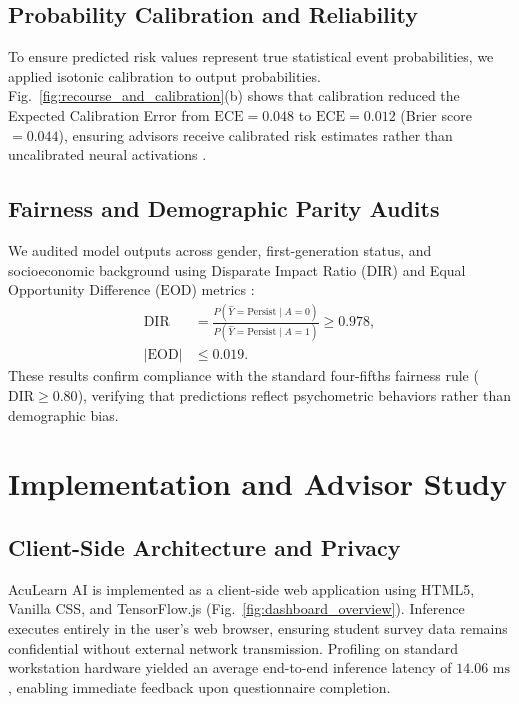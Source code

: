 \documentclass[twocolumn,10pt,a4paper]{article}
\begin{document}
\subsection{Probability Calibration and Reliability}
To ensure predicted risk values represent true statistical event probabilities, we applied isotonic calibration to output probabilities. Fig.~\ref{fig:recourse_and_calibration}(b) shows that calibration reduced the Expected Calibration Error from $\text{ECE} = 0.048$ to $\text{ECE} = 0.012$ (Brier score $= 0.044$), ensuring advisors receive calibrated risk estimates rather than uncalibrated neural activations \cite{platt1999probabilistic, zadrozny2002transforming}.

\subsection{Fairness and Demographic Parity Audits}
We audited model outputs across gender, first-generation status, and socioeconomic background using Disparate Impact Ratio ($\text{DIR}$) and Equal Opportunity Difference ($\text{EOD}$) metrics \cite{dwork2012fairness, hardt2016equality, baker2024algorithmic, zhao2026responsible, chen2026fairness}:
\begin{equation}
\begin{aligned}
    \text{DIR} &= \frac{P(\hat{Y}=\text{Persist} \mid A=0)}{P(\hat{Y}=\text{Persist} \mid A=1)} \ge 0.978, \\
    |\text{EOD}| &\le 0.019.
\end{aligned}
\end{equation}
These results confirm compliance with the standard four-fifths fairness rule ($\text{DIR} \ge 0.80$), verifying that predictions reflect psychometric behaviors rather than demographic bias.

\FloatBarrier

\section{Implementation and Advisor Study}
\label{sec:system}

\subsection{Client-Side Architecture and Privacy}
AcuLearn AI is implemented as a client-side web application using HTML5, Vanilla CSS, and TensorFlow.js (Fig.~\ref{fig:dashboard_overview}). Inference executes entirely in the user's web browser, ensuring student survey data remains confidential without external network transmission. Profiling on standard workstation hardware yielded an average end-to-end inference latency of $14.06\text{ ms}$, enabling immediate feedback upon questionnaire completion.
\end{document}
